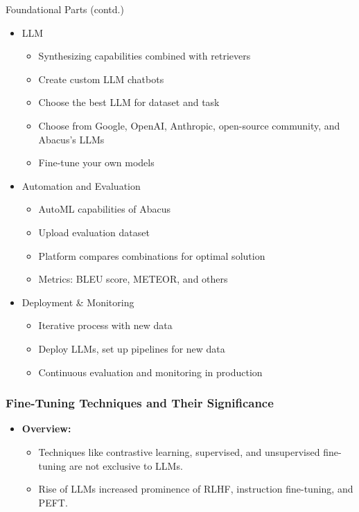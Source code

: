 \begin{frame}[fragile]{Foundational Parts (contd.)}

\begin{itemize}
    \item LLM
    \begin{itemize}
        \item Synthesizing capabilities combined with retrievers
        \item Create custom LLM chatbots
        \item Choose the best LLM for dataset and task
        \item Choose from Google, OpenAI, Anthropic, open-source community, and Abacus's LLMs
        \item Fine-tune your own models
    \end{itemize}
    \item Automation and Evaluation
    \begin{itemize}
        \item AutoML capabilities of Abacus
        \item Upload evaluation dataset
        \item Platform compares combinations for optimal solution
        \item Metrics: BLEU score, METEOR, and others
    \end{itemize}
    \item Deployment \& Monitoring
    \begin{itemize}
        \item Iterative process with new data
        \item Deploy LLMs, set up pipelines for new data
        \item Continuous evaluation and monitoring in production
    \end{itemize}
\end{itemize}
\end{frame}

\begin{frame}[fragile]\frametitle{Fine-Tuning Techniques and Their Significance}
  \begin{itemize}
    \item \textbf{Overview:}
      \begin{itemize}
        \item Techniques like contrastive learning, supervised, and unsupervised fine-tuning are not exclusive to LLMs.
        \item Rise of LLMs increased prominence of RLHF, instruction fine-tuning, and PEFT.
      \end{itemize}
  \end{itemize}
\end{frame}





